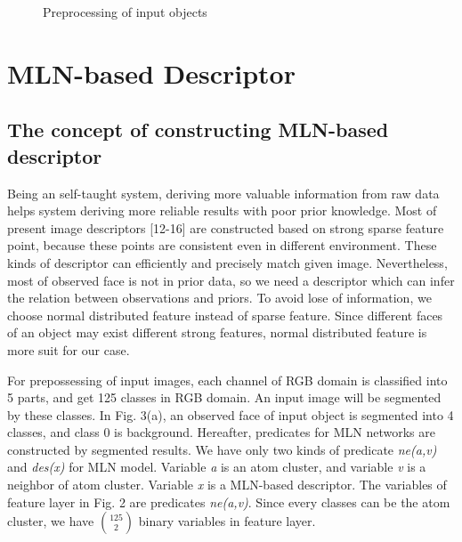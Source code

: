 \documentclass[journal]{IEEEtran}
\begin{document}
\begin{figure}[!t]
\begin{center}
\caption{Preprocessing of input objects}\label{test}
\end{center}
\end{figure}


\section{MLN-based Descriptor}
\subsection{The concept of constructing MLN-based descriptor}
Being an self-taught system, deriving more valuable information from raw data helps system deriving more reliable results with poor prior knowledge. Most of present image descriptors [12-16] are constructed based on strong sparse feature point, because these points are consistent even in different environment. These kinds of descriptor can efficiently and precisely match given image. Nevertheless, most of observed face is not in prior data, so we need a descriptor which can infer the relation between observations and priors. To avoid lose of information, we choose normal distributed feature instead of sparse feature. Since different faces of an object may exist different strong features, normal distributed feature is more suit for our case. 

For prepossessing of input images, each channel of RGB domain is classified into 5 parts, and get 125 classes in RGB domain. An input image will be segmented by these classes. In Fig. 3(a), an observed face of input object is segmented into 4 classes, and class 0 is background. Hereafter, predicates for MLN networks are constructed by segmented results. We have only two kinds of predicate \textit{ne(a,v)} and  \textit{des(x)} for MLN model. Variable \textit{a} is an atom cluster, and variable \textit{v} is a neighbor of atom cluster. Variable \textit{x} is a MLN-based descriptor. The variables of feature layer in Fig. 2 are predicates \textit{ne(a,v)}. Since every classes can be the atom cluster, we have $\binom{125}{2}$ binary variables in feature layer.
\end{document}
